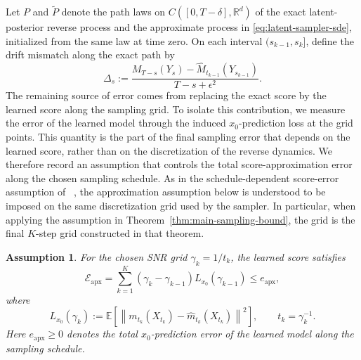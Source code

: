 \documentclass[11pt]{article}
\newtheorem{assumption}{Assumption}
\newcommand{\R}{\mathbb{R}}
\newcommand{\E}{\mathbb{E}}
\newcommand{\eps}{\epsilon}
\newcommand{\norm}[1]{\left\lVert #1 \right\rVert}
\begin{document}
Let $P$ and $\widetilde P$ denote the path laws on $C([0,T-\delta],\R^d)$ of the exact latent-posterior reverse process and the approximate process in \eqref{eq:latent-sampler-sde}, initialized from the same law at time zero. On each interval $(s_{k-1},s_k]$, define the drift mismatch along the exact path by
\begin{equation}
\label{eq:drift-mismatch}
    \Delta_s
    :=
    \frac{
    M_{T-s}(Y_s)
    -
    \widehat M_{t_{k-1}}(Y_{s_{k-1}})
    }{
    T-s+\eps^2
    } .
\end{equation}
The remaining source of error comes from replacing the exact score by the
learned score along the sampling grid. To isolate this contribution, we
measure the error of the learned model through the induced \(x_0\)-prediction
loss at the grid points. This quantity is the part of the final sampling error
that depends on the learned score, rather than on the discretization of the
reverse dynamics. We therefore record an assumption that controls the total
score-approximation error along the chosen sampling schedule.
As in the schedule-dependent score-error assumption of
~\cite{benton2024nearly}, the approximation assumption below is
understood to be imposed on the same discretization grid used by the sampler.
In particular, when applying the assumption in Theorem~\ref{thm:main-sampling-bound}, the
grid is the final \(K\)-step grid constructed in that theorem.
\begin{assumption}
\label{ass:approx-error}
For the chosen SNR grid $\gamma_k=1/t_k$, the learned score satisfies
\[
    \mathcal E_{\mathrm{apx}}
    =
    \sum_{k=1}^K
    (\gamma_k-\gamma_{k-1})
    L_{x_0}(\gamma_{k-1})
    \le e_{\mathrm{apx}},
\]
where
\[
    L_{x_0}(\gamma_k)
    :=
    \E\left[
    \norm{
    m_{t_k}(X_{t_k})-\widehat m_{t_k}(X_{t_k})
    }^2
    \right],
    \qquad
    t_k=\gamma_k^{-1}.
\]
Here $e_{\mathrm{apx}}\ge 0$ denotes the total $x_0$-prediction error of the learned model along the sampling schedule.
\end{assumption}
\end{document}
